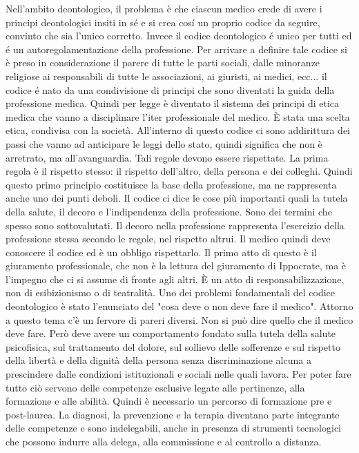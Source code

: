 Nell'ambito deontologico, il problema è che ciascun medico crede di
avere i principi deontologici insiti in sé e si crea cosí un proprio
codice da seguire, convinto che sia l'unico corretto. Invece il codice
deontologico é unico per tutti ed é un autoregolamentazione della
professione. Per arrivare a definire tale codice si è preso in
considerazione il parere di tutte le parti sociali, dalle minoranze
religiose ai responsabili di tutte le associazioni, ai giuristi, ai
medici, ecc... il codice é nato da una condivisione di principi che sono
diventati la guida della professione medica. Quindi per legge è
diventato il sistema dei principi di etica medica che vanno a
disciplinare l'iter professionale del medico. È stata una scelta etica,
condivisa con la società. All'interno di questo codice ci sono
addirittura dei passi che vanno ad anticipare le leggi dello stato,
quindi significa che non è arretrato, ma all'avanguardia. Tali regole
devono essere rispettate. La prima regola è il rispetto stesso: il
rispetto dell'altro, della persona e dei colleghi. Quindi questo primo
principio costituisce la base della professione, ma ne rappresenta anche
uno dei punti deboli. Il codice ci dice le cose più importanti quali la
tutela della salute, il decoro e l'indipendenza della professione. Sono
dei termini che spesso sono sottovalutati. Il decoro nella professione
rappresenta l'esercizio della professione stessa secondo le regole, nel
rispetto altrui. Il medico quindi deve conoscere il codice ed è un
obbligo rispettarlo. Il primo atto di questo è il giuramento
professionale, che non è la lettura del giuramento di Ippocrate, ma è
l'impegno che ci si assume di fronte agli altri. È un atto di
responsabilizzazione, non di esibizionismo o di teatralità. Uno dei
problemi fondamentali del codice deontologico è stato l'enunciato del
"cosa deve o non deve fare il medico". Attorno a questo tema c'è un
fervore di pareri diversi. Non si può dire quello che il medico deve
fare. Però deve avere un comportamento fondato sulla tutela della salute
psicofisica, sul trattamento del dolore, sul sollievo delle sofferenze e
sul rispetto della libertà e della dignità della persona senza
discriminazione alcuna a prescindere dalle condizioni istituzionali e
sociali nelle quali lavora. Per poter fare tutto ciò servono delle
competenze esclusive legate alle pertinenze, alla formazione e alle
abilità. Quindi è necessario un percorso di formazione pre e
post-laurea. La diagnosi, la prevenzione e la terapia diventano parte
integrante delle competenze e sono indelegabili, anche in presenza di
strumenti tecnologici che possono indurre alla delega, alla commissione
e al controllo a distanza.

